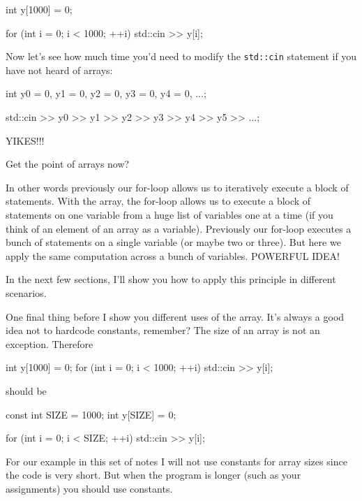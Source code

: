 \begin{consolethree}[escapeinside=||]
int y[1000] = {0};

for (int i = 0; i < 1000; ++i)
{
    std::cin >> y[i];
}
\end{consolethree}

Now let's see how much time you'd need to modify the \texttt{std::cin} statement if you have not heard of arrays:

\begin{consolethree}[escapeinside=||]
int y0 = 0, y1 = 0, y2 = 0, y3 = 0, y4 = 0, ...;

std::cin >> y0 >> y1 >> y2 >> y3 >> y4 >> y5 >> ...; 
\end{consolethree}

YIKES!!!

Get the point of arrays now?

In other words previously our for-loop allows us to iteratively execute
a block of statements. With the array, the for-loop allows us to execute
a block of statements on one variable from a huge list of variables one
at a time (if you think of an element of an array as a variable).
Previously our for-loop executes a bunch of statements on a single
variable (or maybe two or three). But here we apply the same computation
across a bunch of variables. POWERFUL IDEA!

In the next few sections, I'll show you how to apply
this principle in different scenarios.

One final thing before I show you different uses of the array.
It's always a good idea not to hardcode constants,
remember? The size of an array is not an exception. Therefore

\begin{consolethree}[escapeinside=||]
int y[1000] = {0};
for (int i = 0; i < 1000; ++i)
{
    std::cin >> y[i];
} 
\end{consolethree}

should be

\begin{consolethree}[escapeinside=||]const int SIZE = 1000;
int y[SIZE] = {0};

for (int i = 0; i < SIZE; ++i)
{
    std::cin >> y[i];
}
\end{consolethree}

For our example in this set of notes I will not use constants for array
sizes since the code is very short. But when the program is longer (such
as your assignments) you should use constants.

